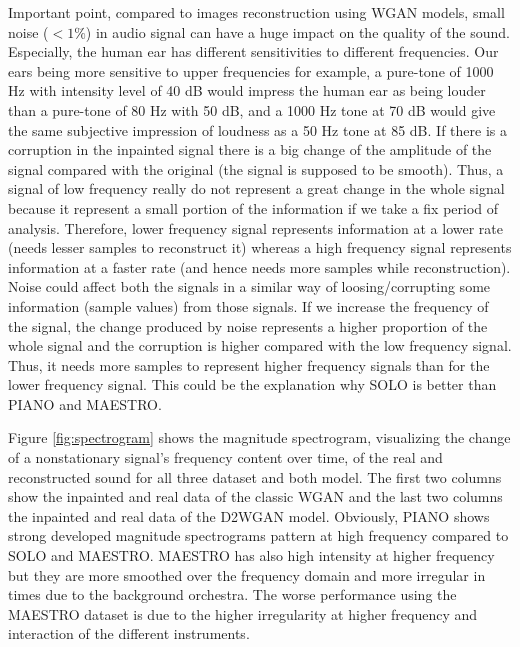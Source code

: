 \documentclass{article} %
\begin{document}
Important point, compared to images reconstruction using WGAN models, small noise ($< 1 \%$) in audio signal can have a huge impact on the quality of the sound. Especially, the human ear has different sensitivities to different frequencies. Our ears being more sensitive to upper frequencies for example, a pure-tone of 1000 Hz with intensity level of 40 dB would impress the human ear as being louder than a pure-tone of 80 Hz with 50 dB, and a 1000 Hz tone at 70 dB would give the same subjective impression of loudness as a 50 Hz tone at 85 dB. If there is a corruption in the inpainted signal there is a big change of the amplitude of the signal compared with the original (the signal is supposed to be smooth). Thus, a signal of low frequency really do not represent a great change in the whole signal because it represent a small portion of the information if we take a fix period of analysis. Therefore, lower frequency signal represents information at a lower rate (needs lesser samples to reconstruct it) whereas a high frequency signal represents information at a faster rate (and hence needs more samples while reconstruction). Noise could affect both the signals in a similar way of loosing/corrupting some information (sample values) from those signals. If we increase the frequency of the signal, the change produced by noise represents a higher proportion of the whole signal and the corruption is higher compared with the low frequency signal. Thus, it needs more samples to represent higher frequency signals than for the lower frequency signal. This could be the explanation why SOLO is better than PIANO and MAESTRO. 

Figure \ref{fig:spectrogram} shows the magnitude spectrogram, visualizing the change of a nonstationary signal’s frequency content over time, of the real and reconstructed sound for all three dataset and both model. The first two columns show the inpainted and real data of the classic WGAN and the last two columns the inpainted and real data of the D2WGAN model. Obviously, PIANO shows strong developed magnitude spectrograms pattern at high frequency compared to SOLO and MAESTRO. MAESTRO has also high intensity at higher frequency but they are more smoothed over the frequency domain and more irregular in times due to the background orchestra. The worse performance using the MAESTRO dataset is due to the higher irregularity at higher frequency and interaction of the different instruments.
\end{document}
